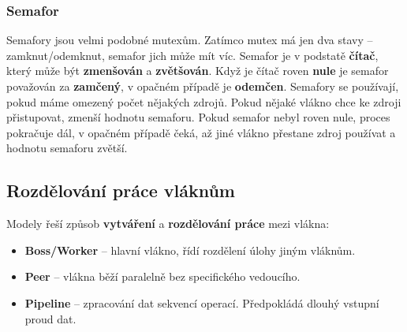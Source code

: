 \subsubsection{Semafor}
Semafory jsou velmi podobné mutexům. Zatímco mutex má jen dva stavy – zamknut/odemknut, semafor jich může mít víc. Semafor je v podstatě \textbf{čítač}, který může být \textbf{zmenšován} a \textbf{zvětšován}. Když je čítač roven \textbf{nule} je semafor považován za \textbf{zamčený}, v opačném případě je \textbf{odemčen}. Semafory se používají, pokud máme omezený počet nějakých zdrojů. Pokud nějaké vlákno chce ke zdroji přistupovat, zmenší hodnotu semaforu. Pokud semafor nebyl roven nule, proces pokračuje dál, v opačném případě čeká, až jiné vlákno přestane zdroj používat a hodnotu semaforu zvětší.

\subsection{Rozdělování práce vláknům}
Modely řeší způsob \textbf{vytváření} a \textbf{rozdělování práce} mezi vlákna:
\begin{itemize}
	\item \textbf{Boss/Worker} -- hlavní vlákno, řídí rozdělení úlohy jiným vláknům.
	\item \textbf{Peer} -- vlákna běží paralelně bez specifického vedoucího.
	\item \textbf{Pipeline} -- zpracování dat sekvencí operací. Předpokládá dlouhý vstupní proud dat.
\end{itemize}